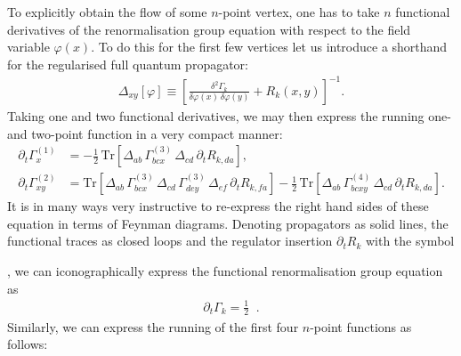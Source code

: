 \documentclass[11pt]{book}
\newcommand{\Tr}{\mathrm{Tr}}
\numberwithin{equation}{chapter}
\begin{document}
To explicitly obtain the flow of some $n$-point vertex, one has to take
$n$ functional derivatives of the renormalisation group equation with respect
to the field variable $\varphi(x)$. To do this for the first few vertices
let us introduce a shorthand for the regularised full quantum propagator:
\begin{align}
  \Delta_{xy} [\varphi] \equiv
  \left[
    \frac{\delta^{2}\Gamma_k}{\delta\varphi(x) \, \delta\varphi(y)} + R_k(x,y)
  \right]^{-1} .
\end{align}
Taking one and two functional derivatives, we may then express the running one-
and two-point function in a very compact manner:
\begin{align}
  \partial_t \Gamma^{(1)}_{x} &=
  - \frac 12 \, \Tr
  \left[
    \Delta_{ab} \,
    \Gamma^{(3)}_{bcx} \,
    \Delta_{cd} \,
    \partial_t R_{k,da}
  \right] , \\
  \partial_t \Gamma^{(2)}_{xy} &=
  \Tr
  \left[
    \Delta_{ab} \,
    \Gamma^{(3)}_{bcx} \,
    \Delta_{cd} \,
    \Gamma^{(3)}_{dey} \,
    \Delta_{ef} \,
    \partial_t R_{k,fa}
  \right]
  - \frac 12 \, \Tr
  \left[
    \Delta_{ab} \,
    \Gamma^{(4)}_{bcxy} \,
    \Delta_{cd} \,
    \partial_t R_{k,da}
  \right] .
\end{align}
It is in many ways very instructive to re-express the right hand sides of
these equation in terms of Feynman diagrams. Denoting propagators
as solid lines, the functional traces as closed loops and the regulator
insertion $\partial_t R_k$ with the symbol

\hspace{-2.8mm}
, we can iconographically express the
functional renormalisation group equation as
\begin{align}
  \partial_t \Gamma_k = \frac12 \;
   \;.
\end{align}
Similarly, we can express the running of the first four $n$-point
functions as follows:
\end{document}
